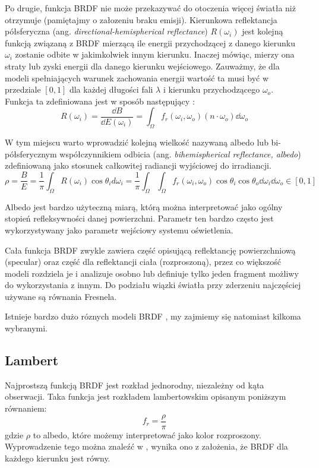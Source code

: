 \documentclass[../main.tex]{subfiles}
\begin{document}
Po drugie, funkcja BRDF nie może przekazywać do otoczenia więcej światła niż otrzymuje (pamiętajmy o załozeniu braku emisji). Kierunkowa reflektancja półsferyczna (ang. \textit{directional-hemispherical reflectance}) $R(\omega_i)$ jest kolejną funkcją związaną z BRDF mierzącą ile energii przychodzącej z danego kierunku $\omega_i$ zostanie odbite w jakimkolwiek innym kierunku. Inaczej mówiąc, mierzy ona straty lub zyski energii dla danego kierunku wejściowego. Zauważmy, że dla modeli spełniających warunek zachowania energii wartość ta musi być w przedziale $\left[0,1\right]$ dla każdej długości fali $\lambda$ i kierunku przychodzącego $\omega_o$. Funkcja ta zdefiniowana jest w sposób następujący \cite{RealTimeRendering2008}:
\[
  R(\omega_i) 
  = \frac{\dd B}{\dd E(\omega_i)} 
  = \int_{\Omega} {
    f_r(\omega_i, \omega_o)
    (n \cdot \omega_o)
    \dd \omega_o
  }
\]

W tym miejscu warto wprowadzić kolejną wielkość nazywaną albedo lub bi-półsferycznym współczynnikiem odbicia (ang. \textit{bihemispherical reflectance, albedo}) zdefiniowaną jako stosunek całkowitej radiancji wyjściowej do irradiancji.
\[
    \rho = \frac{B}{E} = \frac{1}{\pi} \int_{\Omega}{
        R(\omega_i) \cos\theta_i d\omega_i
    }
    = \frac{1}{\pi} \int_{\Omega} \int_{\Omega} {
        f_r(\omega_i, \omega_o) 
        \cos\theta_i 
        \cos\theta_o 
        \dd\omega_i 
        \dd\omega_o
    }
    \in \left[0, 1\right]
\]

Albedo jest bardzo użyteczną miarą, którą można interpretować jako ogólny stopień refleksywności danej powierzchni. Parametr ten bardzo często jest wykorzystywany jako parametr wejściowy systemu oświetlenia.

Cała funkcja BRDF zwykle zawiera część opisującą reflektancję powierzchniową (specular) oraz część dla reflektancji ciała (rozproszoną), przez co większość modeli rozdziela je i analizuje osobno lub definiuje tylko jeden fragment możliwy do wykorzystania z innym. Do podziału wiązki światła przy zderzeniu najczęściej używane są równania Fresnela.

Istnieje bardzo dużo róznych modeli BRDF \cite{brdf_overview}, my zajmiemy się natomiast kilkoma wybranymi.

\subsection{Lambert}

Najprostszą funkcją BRDF jest rozkład jednorodny, niezależny od kąta obserwacji. Taka funkcja jest rozkładem lambertowskim opisanym poniższym równaniem:
\[
  f_r = \frac{\rho}{\pi}
\]
\noindent gdzie $\rho$ to albedo, które możemy interpretować jako kolor rozproszony. Wyprowadzenie tego można znaleźć w \cite{RealTimeRendering2008}\cite{pbr_games_siggraph}, wynika ono z założenia, że BRDF dla każdego kierunku jest równy.
\end{document}
